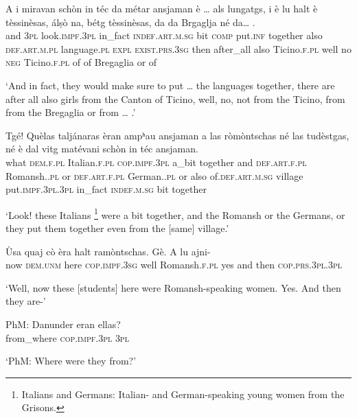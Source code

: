 \begin{linenumbers}
\gll    A i miravan schòn in téc da métar ansjaman è … als lungatgs, i è lu halt è tèssinèsas, álṣò na, bétg tèssinèsas, da da Brgaglja\footnotemark{} né da… .\\
and \textsc{3pl} look.\textsc{impf.3pl} in\_fact \textsc{indef.art.m.sg} bit  \textsc{comp} put.\textsc{inf} together also {} \textsc{def.art.m.pl} language.\textsc{pl} \textsc{expl} \textsc{exist.prs.3sg} then after\_all also Ticino.\textsc{f.pl} well no \textsc{neg} Ticino.\textsc{f.pl} of of Bregaglia or of\\
\end{linenumbers}
\medskip
\glt `And in fact, they would make sure to put … the languages together, there are after all also girls from the Canton of Ticino, well, no, not from the Ticino, from from the Bregaglia or from … .'
\medskip

\begin{linenumbers}
\gll    Tgé! Quèlas taljánaras èran ampʰau ansjaman a las ròmòntschas né las tudèstgas, né è dal vitg matévani schòn in téc ansjaman.\\
what \textsc{dem.f.pl} Italian.\textsc{f.pl} \textsc{cop.impf.3pl} a\_bit together and \textsc{def.art.f.pl} Romansh.\textsc{.pl} or  \textsc{def.art.f.pl} German.\textsc{.pl} or also of.\textsc{def.art.m.sg} village put.\textsc{impf.3pl.3pl} in\_fact \textsc{indef.m.sg} bit together\\
\end{linenumbers}
\medskip
\glt `Look! these Italians \footnote{Italians and Germans: Italian- and German-speaking young women from the Grisons.} were a bit together, and the Romansh or the Germans, or they put them together even from the [same] village.'
\medskip

\begin{linenumbers}
\gll Ùsa quaj cò èra halt ramòntschas. Gè. A lu ajni-\\
now \textsc{dem.unm} here \textsc{cop.impf.3sg} well Romansh.\textsc{f.pl} yes and then \textsc{cop.prs.3pl.3pl}  \\
\end{linenumbers}
\medskip
\glt `Well, now these [students] here were Romansh-speaking women. Yes. And then they are-'
\medskip

\begin{linenumbers}
\gll    PhM: Danunder eran ellas?
\\
{} from\_where \textsc{cop.impf.3pl} \textsc{3pl} \\
\end{linenumbers}
\medskip
\glt `PhM: Where were they from?'
\medskip

